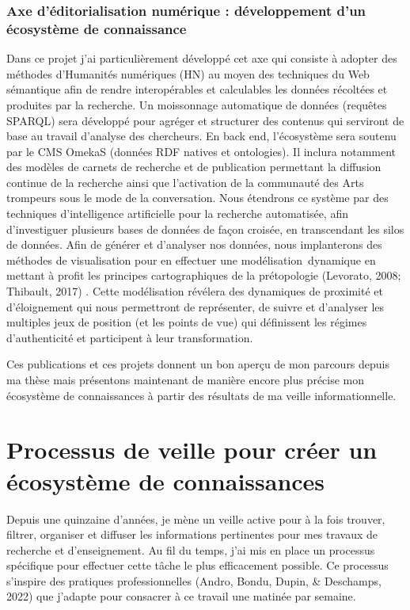 \documentclass[
  a4paper,
  DIV=11,
  numbers=noendperiod]{scrreprt}
\begin{document}
\subsubsection{Axe d'éditorialisation numérique : développement d'un
écosystème de
connaissance}\label{axe-duxe9ditorialisation-numuxe9rique-duxe9veloppement-dun-uxe9cosystuxe8me-de-connaissance}

Dans ce projet j'ai particulièrement développé cet axe qui consiste à
adopter des méthodes d'Humanités numériques (HN) au moyen des techniques
du Web sémantique afin de rendre interopérables et calculables les
données récoltées et produites par la recherche. Un moissonnage
automatique de données (requêtes SPARQL) sera développé pour agréger et
structurer des contenus qui serviront de base au travail d'analyse des
chercheurs. En back end, l'écosystème sera soutenu par le CMS OmekaS
(données RDF natives et ontologies). Il inclura notamment des modèles de
carnets de recherche et de publication permettant la diffusion continue
de la recherche ainsi que l'activation de la communauté des Arts
trompeurs sous le mode de la conversation. Nous étendrons ce système par
des techniques d'intelligence artificielle pour la recherche
automatisée, afin d'investiguer plusieurs bases de données de façon
croisée, en transcendant les silos de données. Afin de générer et
d'analyser nos données, nous implanterons des méthodes de visualisation
pour en effectuer une modélisation~dynamique en mettant à profit les
principes cartographiques de la prétopologie (Levorato, 2008; Thibault,
2017) . Cette modélisation révélera des dynamiques de proximité et
d'éloignement qui nous permettront de représenter, de suivre et
d'analyser les multiples jeux de position (et les points de vue) qui
définissent les régimes d'authenticité et participent à leur
transformation.

Ces publications et ces projets donnent un bon aperçu de mon parcours
depuis ma thèse mais présentons maintenant de manière encore plus
précise mon écosystème de connaissances à partir des résultats de ma
veille informationnelle.

\section{Processus de veille pour créer un écosystème de
connaissances}\label{sec-processusVeille}

Depuis une quinzaine d'années, je mène un veille active pour à la fois
trouver, filtrer, organiser et diffuser les informations pertinentes
pour mes travaux de recherche et d'enseignement. Au fil du temps, j'ai
mis en place un processus spécifique pour effectuer cette tâche le plus
efficacement possible. Ce processus s'inspire des pratiques
professionnelles (Andro, Bondu, Dupin, \& Deschamps, 2022) que j'adapte
pour consacrer à ce travail une matinée par semaine.
\end{document}
